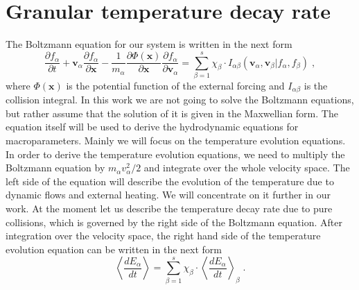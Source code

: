 \documentclass[preprint, aps, pra]{revtex4-1}
\newcommand{\ab}{{\alpha\beta}}
\newcommand{\bx}{{\bm{x}}}
\newcommand{\bv}{{\bm{v}}}
\newcommand{\pd}{\partial}
\begin{document}
\section{Granular temperature decay rate}
The Boltzmann equation for our system is written in the next form 
\begin{equation}\label{eq:Boltzmann_eq}
  \frac{\pd f_\alpha}{\pd t}+\bv_\alpha\frac{\pd f_\alpha}{\pd\bx}-\frac{1}{m_\alpha}\frac{\pd\Phi(\bx)}{\pd\bx}\frac{\pd f_\alpha}{\pd\bv_\alpha}=
  \sum_{\beta=1}^{s}\chi_\beta\cdot I_\ab(\bv_\alpha,\bv_\beta\vert f_\alpha,f_\beta)\;,
\end{equation}
where $\Phi(\bx)$ is the potential function of the external forcing and $I_\ab$ is the collision integral. In this work we are not going to 
solve the Boltzmann equations, but rather assume that the solution of it is given in the Maxwellian form. The equation itself will be used
to derive the hydrodynamic equations for macroparameters. Mainly we will focus on the temperature evolution equations. In order to derive
the temperature evolution equations, we need to multiply the Boltzmann equation by $m_\alpha v_\alpha^2/2$ and integrate over the whole 
velocity space. The left side of the equation will describe the evolution of the temperature due to dynamic flows and external heating. We will
concentrate on it further in our work. At the moment let us describe the temperature decay rate due to pure collisions, which is governed
by the right side of the Boltzmann equation. After integration over the velocity space, the right hand side of the temperature evolution 
equation can be written in the next form
\begin{equation}
  \left\langle\frac{dE_\alpha}{dt}\right\rangle = \sum_{\beta=1}^{s}\chi_\beta\cdot\left\langle\frac{d E_\alpha}{dt}\right\rangle_\beta\;.
\end{equation}
\end{document}
